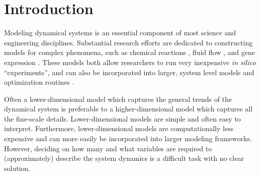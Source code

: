 

\chapter{Introduction\label{ch:intro}}

Modeling dynamical systems is an essential component of most science and engineering disciplines. 
%
Substantial research efforts are dedicated to constructing models for complex phenomena, such as chemical reactions \cite{dong2007simplification, gillespie1977exact, gallagher1986combined}, fluid flow \cite{anderson1995computational}, and gene expression \cite{bar2004analyzing, storey2005significance}. 
%
These models both allow researchers to run very inexpensive {\em in silico} ``experiments'', and can also be incorporated into larger, system level models and optimization routines \cite{daoutidis2013engineering, oluwole2006rigorous, rubert2014advanced}. 

Often a lower-dimensional model which captures the general trends of the dynamical system is preferable to a higher-dimensional model which captures all the fine-scale details. 
%
Lower-dimensional models are simple and often easy to interpret.
%
Furthermore, lower-dimensional models are computationally less expensive and can more easily be incorporated into larger modeling frameworks. 
%
However, deciding on how many and what variables are required to (approximately) describe the system dynamics is a difficult task with no clear solution. 





